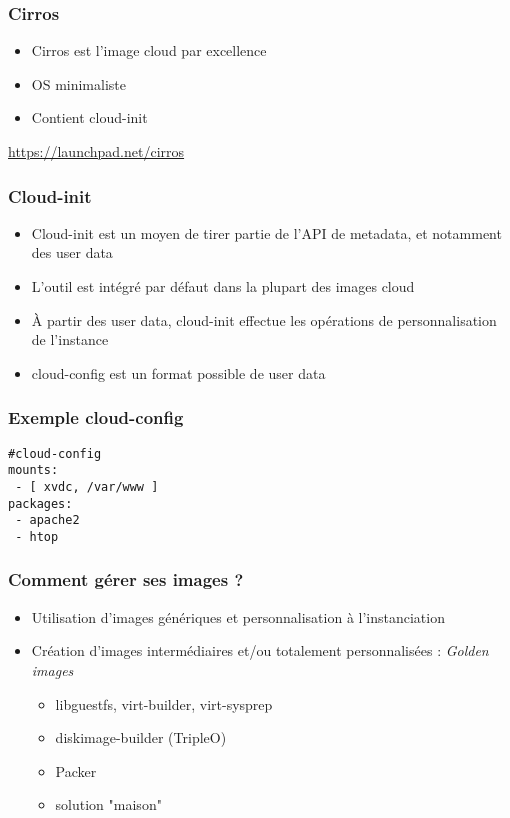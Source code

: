   \begin{frame}
    \frametitle{Cirros}
    \begin{itemize}
      \item Cirros est l'image cloud par excellence
      \item OS minimaliste
      \item Contient cloud-init
    \end{itemize}
    \url{https://launchpad.net/cirros}
  \end{frame}

  \begin{frame}
    \frametitle{Cloud-init}
    \begin{itemize}
      \item Cloud-init est un moyen de tirer partie de l'API de metadata, et notamment des user data
      \item L'outil est intégré par défaut dans la plupart des images cloud
      \item À partir des user data, cloud-init effectue les opérations de personnalisation de l'instance
      \item cloud-config est un format possible de user data
    \end{itemize}
  \end{frame}

  \begin{frame}[containsverbatim]
    \frametitle{Exemple cloud-config}
\begin{verbatim}
#cloud-config
mounts:
 - [ xvdc, /var/www ]
packages:
 - apache2
 - htop
\end{verbatim}
  \end{frame}

  \begin{frame}
    \frametitle{Comment gérer ses images ?}
    \begin{itemize}
      \item Utilisation d'images génériques et personnalisation à l'instanciation
      \item Création d'images intermédiaires et/ou totalement personnalisées : \textit{Golden images}
      \begin{itemize}
        \item libguestfs, virt-builder, virt-sysprep
        \item diskimage-builder (TripleO)
        \item Packer
        \item solution "maison"
      \end{itemize}
    \end{itemize}
  \end{frame}


